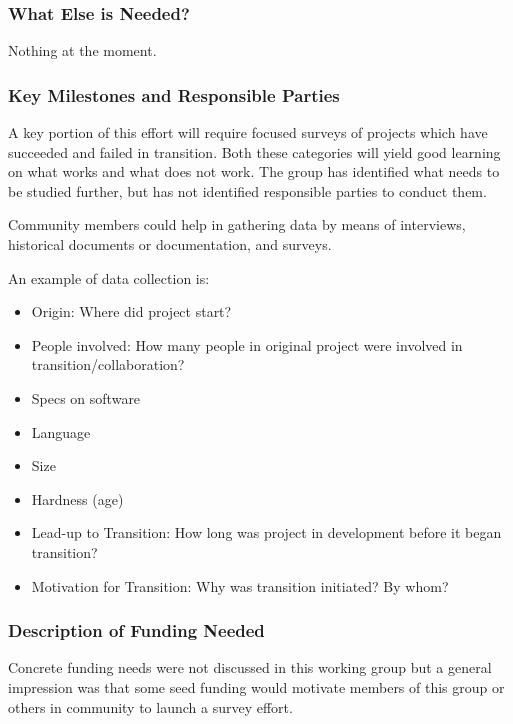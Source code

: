 \subsubsection{What Else is Needed?}
Nothing at the moment. 

\subsubsection{Key Milestones and Responsible Parties}

A key portion of this effort will require focused surveys of projects which have
succeeded and failed in transition. Both these categories will yield good
learning on what works and what does not work. The group has identified what
needs to be studied further, but has not identified responsible parties to
conduct them.

Community members could help in gathering data by means of interviews, historical
documents or documentation, and surveys.

An example of data collection is: 
\begin{itemize}
\item Origin: Where did project start? 
\item People involved: How many people in original project were involved in
transition/collaboration?
\item Specs on software
\item Language
\item Size
\item Hardness (age)
\item Lead-up to Transition: How long was project in development before it began transition?
\item Motivation for Transition: Why was transition initiated? By whom? 
\end{itemize}

\subsubsection{Description of Funding Needed}

Concrete funding needs were not discussed in this working group but a general
impression was that some seed funding would motivate members of this group or
others in community to launch a survey effort.
